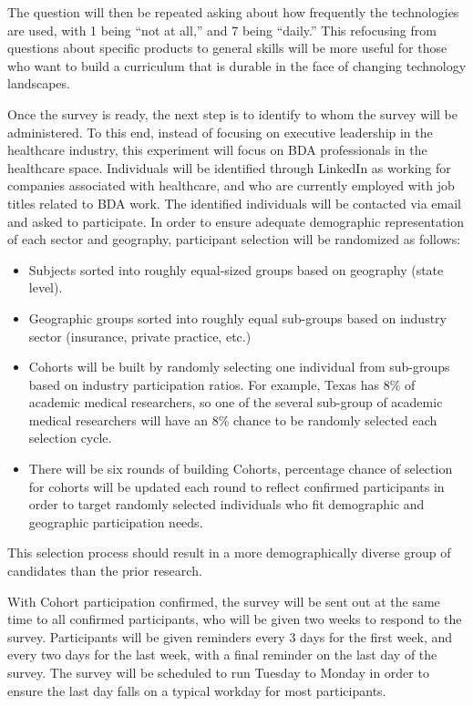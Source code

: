 The question will then be repeated asking about how frequently the technologies are used, with 1 being ``not at all,'' and 7 being ``daily.'' This refocusing from questions about specific products to general skills will be more useful for those who want to build a curriculum that is durable in the face of changing technology landscapes.

Once the survey is ready, the next step is to identify to whom the survey will be administered. To this end, instead of focusing on executive leadership in the healthcare industry, this experiment will focus on BDA professionals in the healthcare space. Individuals will be identified through LinkedIn as working for companies associated with healthcare, and who are currently employed with job titles related to BDA work. The identified individuals will be contacted via email and asked to participate. In order to ensure adequate demographic representation of each sector and geography, participant selection will be randomized as follows:

\begin{itemize}
  \item Subjects sorted into roughly equal-sized groups based on geography (state level).
  \item Geographic groups sorted into roughly equal sub-groups based on industry sector (insurance, private practice, etc.)
  \item Cohorts will be built by randomly selecting one individual from sub-groups based on industry participation ratios. For example, Texas has 8\% of academic medical researchers, so one of the several sub-group of academic medical researchers will have an 8\% chance to be randomly selected each selection cycle.
  \item There will be six rounds of building Cohorts, percentage chance of selection for cohorts will be updated each round to reflect confirmed participants in order to target randomly selected individuals who fit demographic and geographic participation needs.
\end{itemize}

This selection process should result in a more demographically diverse group of candidates than the prior research.

With Cohort participation confirmed, the survey will be sent out at the same time to all confirmed participants, who will be given two weeks to respond to the survey. Participants will be given reminders every 3 days for the first week, and every two days for the last week, with a final reminder on the last day of the survey. The survey will be scheduled to run Tuesday to Monday in order to ensure the last day falls on a typical workday for most participants.

